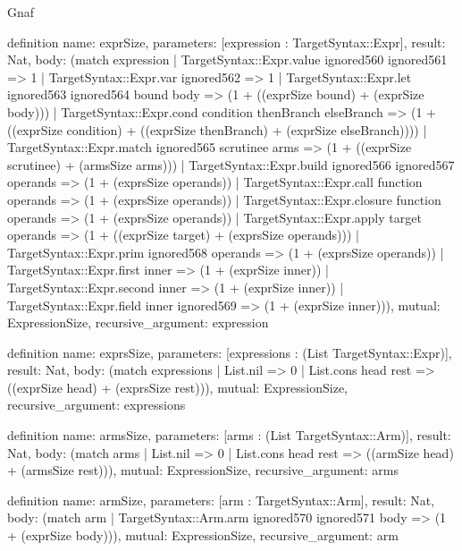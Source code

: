 \begin{lexlean}{Gnaf}
\begin{semanticmodule}
definition{
  name: exprSize,
  parameters: [expression : TargetSyntax::Expr],
  result: Nat,
  body: (match expression
    | TargetSyntax::Expr.value ignored560 ignored561 => 1
    | TargetSyntax::Expr.var ignored562 => 1
    | TargetSyntax::Expr.let ignored563 ignored564 bound body => (1 + ((exprSize bound) + (exprSize body)))
    | TargetSyntax::Expr.cond condition thenBranch elseBranch => (1 + ((exprSize condition) + ((exprSize thenBranch) + (exprSize elseBranch))))
    | TargetSyntax::Expr.match ignored565 scrutinee arms => (1 + ((exprSize scrutinee) + (armsSize arms)))
    | TargetSyntax::Expr.build ignored566 ignored567 operands => (1 + (exprsSize operands))
    | TargetSyntax::Expr.call function operands => (1 + (exprsSize operands))
    | TargetSyntax::Expr.closure function operands => (1 + (exprsSize operands))
    | TargetSyntax::Expr.apply target operands => (1 + ((exprSize target) + (exprsSize operands)))
    | TargetSyntax::Expr.prim ignored568 operands => (1 + (exprsSize operands))
    | TargetSyntax::Expr.first inner => (1 + (exprSize inner))
    | TargetSyntax::Expr.second inner => (1 + (exprSize inner))
    | TargetSyntax::Expr.field inner ignored569 => (1 + (exprSize inner))),
  mutual: ExpressionSize,
  recursive_argument: expression
}

definition{
  name: exprsSize,
  parameters: [expressions : (List TargetSyntax::Expr)],
  result: Nat,
  body: (match expressions
    | List.nil => 0
    | List.cons head rest => ((exprSize head) + (exprsSize rest))),
  mutual: ExpressionSize,
  recursive_argument: expressions
}

definition{
  name: armsSize,
  parameters: [arms : (List TargetSyntax::Arm)],
  result: Nat,
  body: (match arms | List.nil => 0 | List.cons head rest => ((armSize head) + (armsSize rest))),
  mutual: ExpressionSize,
  recursive_argument: arms
}

definition{
  name: armSize,
  parameters: [arm : TargetSyntax::Arm],
  result: Nat,
  body: (match arm | TargetSyntax::Arm.arm ignored570 ignored571 body => (1 + (exprSize body))),
  mutual: ExpressionSize,
  recursive_argument: arm
}


\end{semanticmodule}
\end{lexlean}
